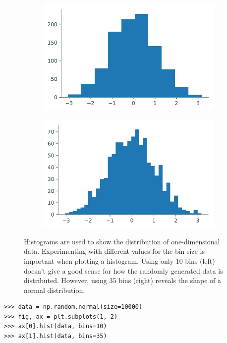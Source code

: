 \begin{figure}[H] %
    \centering
    \begin{subfigure}{.47\textwidth}
        \centering
        \includegraphics[width=\textwidth]{figures/hist1.pdf}
    \end{subfigure}
    \begin{subfigure}{.47\textwidth}
        \centering
        \includegraphics[width=\textwidth]{figures/hist2.pdf}
    \end{subfigure}
    \caption{Histograms are used to show the distribution of one-dimensional data. Experimenting with different values for the bin size is important when plotting a histogram. Using only 10 bins (left) doesn't give a good sense for how the randomly generated data is distributed. However, using 35 bins (right) reveals the shape of a normal distribution.}
\end{figure}

\begin{lstlisting}
>>> data = np.random.normal(size=10000)
>>> fig, ax = plt.subplots(1, 2)
>>> ax[0].hist(data, bins=10)
>>> ax[1].hist(data, bins=35)
\end{lstlisting}

